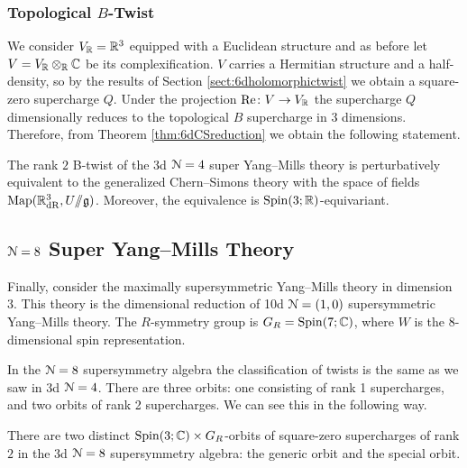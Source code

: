 \documentclass[10pt, oneside]{article}
\renewcommand{\Re}{\mathrm{Re}}
\newcommand{\ham}{/\!\!/}
\begin{document}
\subsubsection{Topological $B$-Twist}
\label{sect:3d_4_B_twist}
We consider $V_\mathbb R=\mathbb R^3$ equipped with a Euclidean structure and as before let $V=V_\mathbb R\otimes_\mathbb R\mathbb C$ be its complexification. $V$ carries a Hermitian structure and a half-density, so by the results of Section \ref{sect:6dholomorphictwist} we obtain a square-zero supercharge $Q$. Under the projection $\Re\colon V\rightarrow V_\RR$ the supercharge $Q$ dimensionally reduces to the topological $B$ supercharge in 3 dimensions. Therefore, from Theorem \ref{thm:6dCSreduction} we obtain the following statement.

\begin{theorem} \label{3d_4_B_twist_thm}
The rank $2$ B-twist of the 3d $\mathcal{N}=4$ super Yang--Mills theory is perturbatively equivalent to the generalized Chern--Simons theory with the space of fields $\map(\RR^3_{\mr{dR}}, U\ham \gg)$. Moreover, the equivalence is $\mathrm{Spin}(3; \mathbb R)$-equivariant.
\end{theorem}

\subsection{\texorpdfstring{$\mathcal N = 8$}{N=8} Super Yang--Mills Theory} \label{3d8section}
Finally, consider the maximally supersymmetric Yang--Mills theory in dimension 3.
This theory is the dimensional reduction of 10d $\mathcal N = (1,0)$ supersymmetric Yang--Mills theory.  
The $R$-symmetry group is $G_R = \mathrm{Spin}(7;\mathbb C)$, where $W$ is the $8$-dimensional spin representation.

In the $\mathcal{N}=8$ supersymmetry algebra the classification of twists is the same as we saw in 3d $\mathcal{N}=4$.  
There are three orbits: one consisting of rank 1 supercharges, and two orbits of rank 2 supercharges.  We can see this in the following way.
\begin{lemma}
There are two distinct $\mathrm{Spin}(3;\mathbb C) \times G_R$-orbits of square-zero supercharges of rank $2$ in the 3d $\mathcal{N}=8$ supersymmetry algebra: the generic orbit and the special orbit.
\label{lm:3dN8twoorbits}
\end{lemma}
\end{document}
